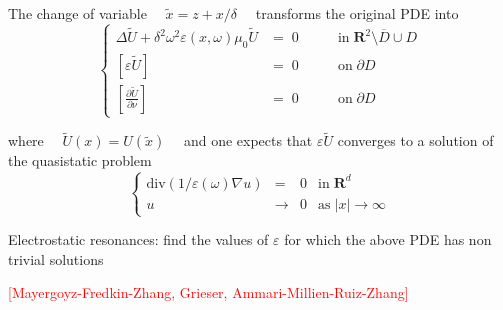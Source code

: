 \documentclass[mathserif,9pt]{beamer}
\def\d{{\delta }}
\def\e{{\varepsilon}}
\def\R{\mathbf R}
\begin{document}
\begin{frame}
\small{

The change of variable $\quad \tilde{x} = z + x/\delta \quad$ transforms the original
PDE into
\textcolor{ox}{
\[
\left\{ \begin{array}{llcl}
\Delta \tilde{U} + \d^2 \omega^2 \varepsilon(x, \omega)\mu_0 \tilde{U} &= \;0
&\qquad \textrm{in}\; \R^2\setminus \overline{D} \cup D
\\ [6pt]
\left[\varepsilon \tilde{U}\right] &=\; 0& 
\qquad \textrm{on}\; \partial D
\\ [6pt]
\left[ \frac{\partial \tilde{U}}{\partial \nu}\right] &=\; 0& 
\qquad \textrm{on}\; \partial D
\end{array}\right.
\]}
\medskip

where $\quad \tilde{U}(x) = U(\tilde{x}) \quad$ and one expects
that $\e \tilde{U}$ converges to a solution of the quasistatic problem
\textcolor{ox}{
\[
\left\{ \begin{array}{ccll}
\textrm{div}(1/\e(\omega) \nabla u) &=& 0 & \textrm{in}\; \R^d
\\
u& \to & 0 & \textrm{as}\;|x| \to \infty
\end{array}\right.
\]}
\medskip

\textcolor{ox}{
Electrostatic resonances: find the values of $\e$ for which the above PDE 
has non trivial solutions}
\medskip



\textcolor{red}{[Mayergoyz-Fredkin-Zhang, Grieser, Ammari-Millien-Ruiz-Zhang]} 



}
\end{frame}
\end{document}

